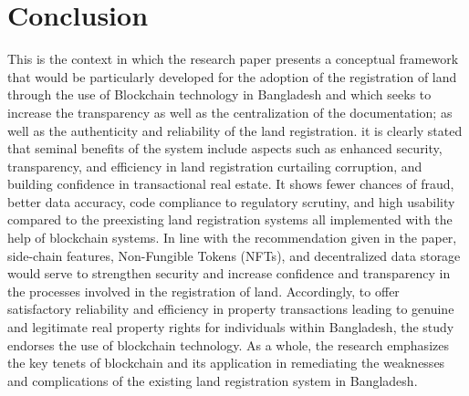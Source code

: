 \documentclass[conference]{IEEEtran}
\begin{document}
\section{Conclusion}
This is the context in which the research paper presents a conceptual framework that would be particularly developed for the adoption of the registration of land through the use of Blockchain technology in Bangladesh and which seeks to increase the transparency as well as the centralization of the documentation; as well as the authenticity and reliability of the land registration. it is clearly stated that seminal benefits of the system include aspects such as enhanced security, transparency, and efficiency in land registration curtailing corruption, and building confidence in transactional real estate. It shows fewer chances of fraud, better data accuracy, code compliance to regulatory scrutiny, and high usability compared to the preexisting land registration systems all implemented with the help of blockchain systems. In line with the recommendation given in the paper, side-chain features, Non-Fungible Tokens (NFTs), and decentralized data storage would serve to strengthen security and increase confidence and transparency in the processes involved in the registration of land. Accordingly, to offer satisfactory reliability and efficiency in property transactions leading to genuine and legitimate real property rights for individuals within Bangladesh, the study endorses the use of blockchain technology. As a whole, the research emphasizes the key tenets of blockchain and its application in remediating the weaknesses and complications of the existing land registration system in Bangladesh.
\end{document}
